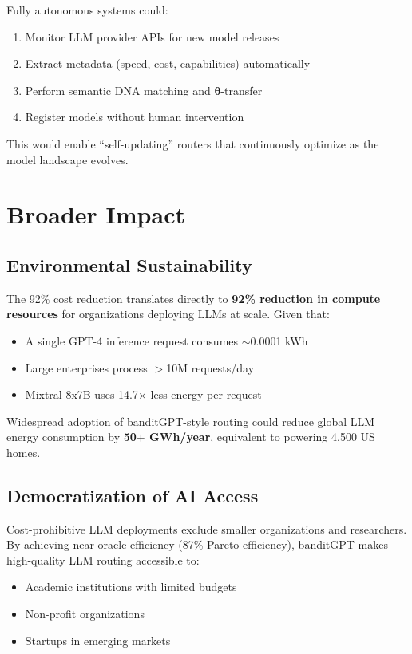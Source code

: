 \documentclass[sigconf]{acmart}
\begin{document}
Fully autonomous systems could:
\begin{enumerate}
    \item Monitor LLM provider APIs for new model releases
    \item Extract metadata (speed, cost, capabilities) automatically
    \item Perform semantic DNA matching and $\boldsymbol{\theta}$-transfer
    \item Register models without human intervention
\end{enumerate}

This would enable ``self-updating'' routers that continuously optimize as the model landscape evolves.

\section{Broader Impact}

\subsection{Environmental Sustainability}

The 92\% cost reduction translates directly to \textbf{92\% reduction in compute resources} for organizations deploying LLMs at scale. Given that:
\begin{itemize}
    \item A single GPT-4 inference request consumes $\sim$0.0001 kWh~\cite{patterson2022carbon}
    \item Large enterprises process $>$10M requests/day
    \item Mixtral-8x7B uses 14.7$\times$ less energy per request
\end{itemize}

Widespread adoption of banditGPT-style routing could reduce global LLM energy consumption by \textbf{50$+$ GWh/year}, equivalent to powering 4,500 US homes.

\subsection{Democratization of AI Access}

Cost-prohibitive LLM deployments exclude smaller organizations and researchers. By achieving near-oracle efficiency (87\% Pareto efficiency), banditGPT makes high-quality LLM routing accessible to:
\begin{itemize}
    \item Academic institutions with limited budgets
    \item Non-profit organizations
    \item Startups in emerging markets
\end{itemize}
\end{document}
